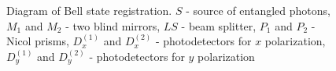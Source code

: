 \begin{figure}
\centering


\caption{Diagram of Bell state registration. $S$ - source of entangled photons, $M_1$ and $M_2$ - two blind mirrors, $LS$ - beam splitter, $P_1$ and $P_2$ - Nicol prisms, $D^{(1)}_x$ and $D^{(2)}_x$ - photodetectors for $x$ polarization, $D^{(1)}_y$ and $D^{(2)}_y$ - photodetectors for $y$ polarization}
\label{figBellReg2}
\end{figure}
